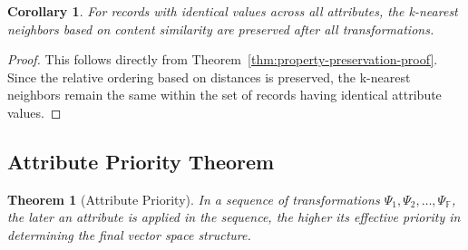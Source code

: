 \documentclass[numbers,sort]{article}
\newtheorem{theorem}{Theorem}
\newtheorem{corollary}{Corollary}
\begin{document}
\begin{corollary}
\label{cor:knn-preservation}
For records with identical values across all attributes, the k-nearest neighbors based on content similarity are preserved after all transformations.
\end{corollary}

\begin{proof}
This follows directly from Theorem~\ref{thm:property-preservation-proof}. Since the relative ordering based on distances is preserved, the k-nearest neighbors remain the same within the set of records having identical attribute values.
\end{proof}

\subsection{Attribute Priority Theorem}
\begin{theorem}[Attribute Priority]
\label{thm:attribute-priority-proof}
In a sequence of transformations $\Psi_1, \Psi_2, \ldots, \Psi_{\mathbb{F}}$, the later an attribute is applied in the sequence, the higher its effective priority in determining the final vector space structure.
\end{theorem}
\end{document}
